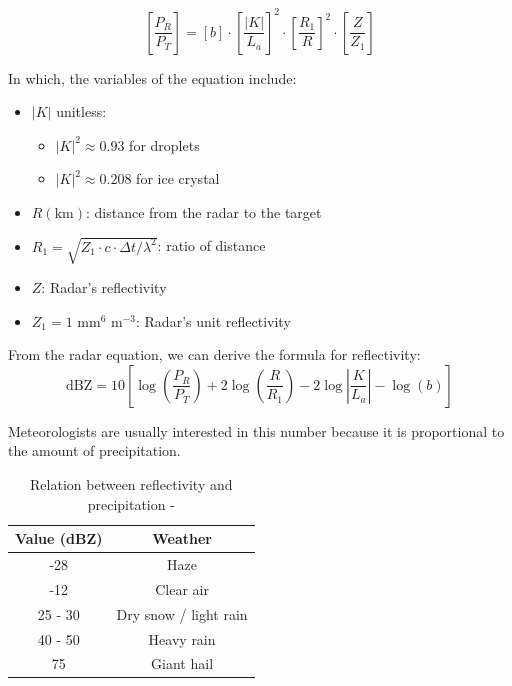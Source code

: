\[
    \left[ \frac{P_R}{P_T} \right]=\left[ b \right]\cdot\left[ \frac{|K|}{L_a} \right]^2\cdot\left[ \frac{R_1}{R} \right]^2\cdot\left[ \frac{Z}{Z_1} \right]
\]
\vspace{0.5cm}

In which, the variables of the equation include:
\begin{itemize}
    \item $|K|$ unitless:
          \begin{itemize}
              \item $|K|^2 \approx 0.93$ for droplets
              \item $|K|^2 \approx 0.208$ for ice crystal
          \end{itemize}
    \item $R (\text{km})$: distance from the radar to the target
    \item $R_1 = \sqrt{Z_1 \cdot c \cdot \Delta t / \lambda^2}$: ratio of distance
    \item $Z$: Radar's reflectivity
    \item $Z_1 = 1 \text{ mm}^6 \text{ m}^{-3}$: Radar's unit reflectivity
\end{itemize}

From the radar equation, we can derive the formula for reflectivity:
\vspace{0.5cm}
\[
    \text{dBZ} = 10\left[ \log\left( \frac{P_R}{P_T} \right) + 2 \log\left( \frac{R}{R_1} \right) - 2\log\left| \frac{K}{L_a} \right| - \log\left( b \right) \right]
\]
\vspace{0.5cm}

Meteorologists are usually interested in this number because it is proportional to the amount of precipitation.
\vspace{0.5cm}

\begin{table}[h]
    \centering
    \begin{tabular}{|c|c|}
        \hline
        Value (dBZ) & Weather               \\
        \hline
        -28         & Haze                  \\
        -12         & Clear air             \\
        25 - 30     & Dry snow / light rain \\
        40 - 50     & Heavy rain            \\
        75          & Giant hail            \\
        \hline
    \end{tabular}
    \vspace{1em}
    \caption{ Relation between reflectivity and precipitation - \citet{2022Weather}}
\end{table}

